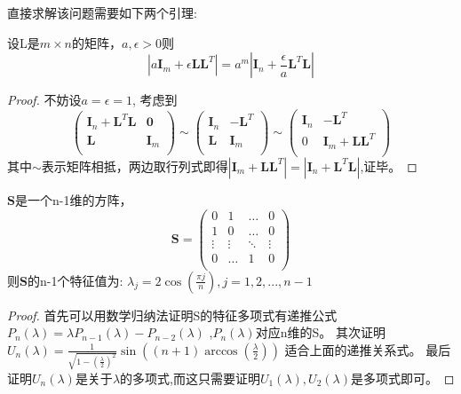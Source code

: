 直接求解该问题需要如下两个引理:
\begin{lemma}\label{lemma:change}
设L是$m\times n$的矩阵，$a,\epsilon > 0$则
\begin{equation}
|a\bm{I}_m+\epsilon \bm{L}\bm{L}^T|=a^m|\bm{I}_n+\frac{\epsilon}{a} \bm{L}^T\bm{L}|
\end{equation}
\end{lemma}
\begin{proof}
不妨设$a=\epsilon=1$,
考虑到
\[
\left(\begin{array}{cc}
\bm{I}_n+\bm{L}^T\bm{L}&\bm{0}\\
\bm{L}&\bm{I}_m\\
\end{array}\right)\sim\left(\begin{array}{cc}
\bm{I}_n&-\bm{L}^T\\
\bm{L}&\bm{I}_m\\
\end{array}\right)\sim\left(\begin{array}{cc}
\bm{I}_n&-\bm{L}^T\\
0&\bm{I}_m+\bm{L}\bm{L}^T\\
\end{array}\right)
\]
其中$\sim$表示矩阵相抵，两边取行列式即得$|\bm{I}_m+\bm{L}\bm{L}^T|=|\bm{I}_n+\bm{L}^T\bm{L}|$,证毕。
\end{proof}


\begin{lemma}\label{lemma:special}
$\bm{S}$是一个n-1维的方阵，\[
\bm{S}=\left(
\begin{array}{cccc}
0&1&\dots&0\\
1&0&\dots&0\\
\vdots&\vdots&\ddots&\vdots\\
0&\dots&1&0\\
\end{array}\right)
\]则$\bm{S}$的n-1个特征值为:
$\lambda_j=2\cos(\frac{\pi j}{n}),j=1,2,...,n-1$
\end{lemma}
\begin{proof}
首先可以用数学归纳法证明S的特征多项式有递推公式$P_n(\lambda)=\lambda P_{n-1}(\lambda)-P_{n-2}(\lambda)$
,$P_n(\lambda)$对应n维的S。
其次证明
$U_n(\lambda)=\frac{1}{\sqrt{1-(\frac{\lambda}{2})^2}}\sin((n+1)\arccos(\frac{\lambda}{2}))
$
适合上面的递推关系式。
最后证明$U_n(\lambda)$是关于$\lambda$的多项式,而这只需要证明$U_1(\lambda),U_2(\lambda)$是多项式即可。
\end{proof}


